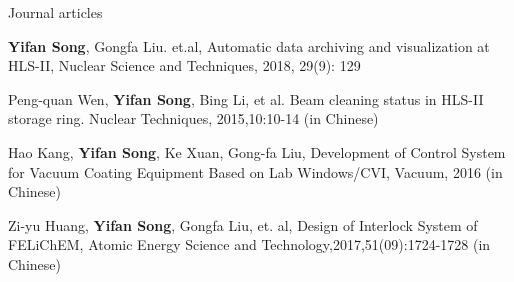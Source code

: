 

\begin{cventries}

  \cventry
    {Journal articles} %
    {} %
    {} %
    {} %
    {
      \begin{cvitems} %
        \item {\textbf{Yifan Song}, Gongfa Liu. et.al, Automatic data archiving and visualization at HLS-II, Nuclear Science and Techniques, 2018, 29(9): 129}
       \item {Peng-quan Wen, \textbf{Yifan Song}, Bing Li, et al. Beam cleaning status in HLS-II storage ring. Nuclear Techniques, 2015,10:10-14 (in Chinese)}
       \item {Hao Kang, \textbf{Yifan Song}, Ke Xuan, Gong-fa Liu, Development of Control System for Vacuum Coating Equipment Based on Lab Windows/CVI, Vacuum, 2016 (in Chinese)}
       \item {Zi-yu Huang, \textbf{Yifan Song}, Gongfa Liu, et. al, Design of Interlock System of FELiChEM, Atomic Energy Science and Technology,2017,51(09):1724-1728 (in Chinese)}
      \end{cvitems}
    }


\end{cventries}
